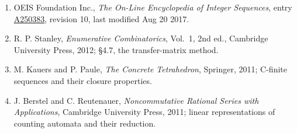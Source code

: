\documentclass[11pt]{article}
\theoremstyle{definition}
\begin{document}
\begin{enumerate}

\item OEIS Foundation Inc., \emph{The On-Line Encyclopedia of Integer Sequences}, entry \href{https://oeis.org/A250383}{A250383}, revision 10, last modified Aug 20 2017.

\item R. P. Stanley, \emph{Enumerative Combinatorics}, Vol.~1, 2nd ed., Cambridge University Press, 2012; \S4.7, the transfer-matrix method.

\item M. Kauers and P. Paule, \emph{The Concrete Tetrahedron}, Springer, 2011; C-finite sequences and their closure properties.

\item J. Berstel and C. Reutenauer, \emph{Noncommutative Rational Series with Applications}, Cambridge University Press, 2011; linear representations of counting automata and their reduction.

\end{enumerate}
\end{document}
